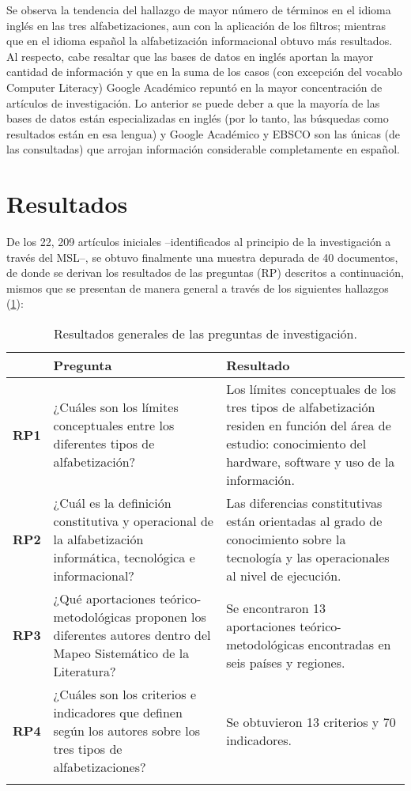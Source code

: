 \documentclass{textolivre}
\begin{document}
Se observa la tendencia del hallazgo de mayor número de términos en el idioma inglés en las tres alfabetizaciones, aun con la aplicación de los filtros; mientras que en el idioma español la alfabetización informacional obtuvo más resultados. Al respecto, cabe resaltar que las bases de datos en inglés aportan la mayor cantidad de información y que en la suma de los casos (con excepción del vocablo Computer Literacy) Google Académico repuntó en la mayor concentración de artículos de investigación. Lo anterior se puede deber a que la mayoría de las bases de datos están especializadas en inglés (por lo tanto, las búsquedas como resultados están en esa lengua) y Google Académico y EBSCO son las únicas (de las consultadas) que arrojan información considerable completamente en español.

\section{Resultados}\label{sec-resultados}
De los 22, 209 artículos iniciales –identificados al principio de la investigación a través del MSL–, se obtuvo finalmente una muestra depurada de 40 documentos, de donde se derivan los resultados de las preguntas (RP) descritos a continuación, mismos que se presentan de manera general a través de los siguientes hallazgos (\cref{tbl06}): 

\begin{table}[htpb]
\caption{Resultados generales de las preguntas de investigación.}
\label{tbl06}
\begin{tabular}{lp{6.5cm}p{6.5cm}}
\toprule
 & Pregunta & Resultado \\
\midrule
\arrayrulecolor[gray]{.7}
\textbf{RP1} &
  ¿Cuáles son los límites conceptuales entre los diferentes tipos de alfabetización?  &
  Los límites conceptuales de los tres tipos de alfabetización residen en función del área de estudio: conocimiento del hardware, software y uso de la información.
  \\ \midrule
\textbf{RP2} &
  ¿Cuál es la definición constitutiva y operacional de la alfabetización informática, tecnológica e informacional? &
  Las diferencias constitutivas están orientadas al grado de conocimiento sobre la tecnología y las operacionales al nivel de ejecución.
  \\ \midrule
\textbf{RP3} &
  ¿Qué aportaciones teórico-metodológicas proponen los diferentes autores dentro del Mapeo Sistemático de la Literatura? &
  Se encontraron 13 aportaciones teórico-metodológicas encontradas en seis países y regiones. 
  \\ \midrule
\textbf{RP4} &
  ¿Cuáles son los criterios e indicadores que definen según los autores sobre los tres tipos de alfabetizaciones? &
  Se obtuvieron 13 criterios y 70 indicadores.
  \\ \arrayrulecolor{black}
\bottomrule
\end{tabular}
\end{table}
\end{document}

